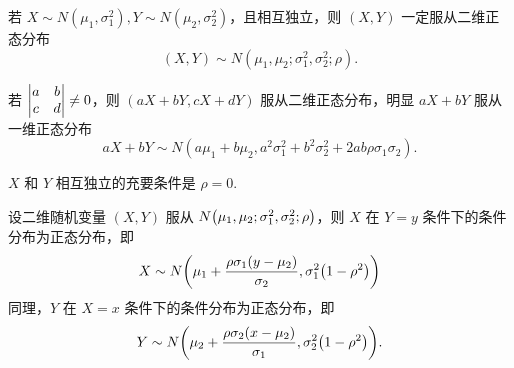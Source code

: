 \begin{theorem}[独立一维正态分布推出二维正态分布]
    若 $ X \sim N\left(\mu_{1}, \sigma_{1}^{2}\right), Y \sim N\left(\mu_{2}, \sigma_{2}^{2}\right)$，且相互独立，则 $ (X, Y) $ 一定服从二维正态分布
    $$ (X, Y) \sim N\left(\mu_{1}, \mu_{2}; \sigma_{1}^{2}, \sigma_{2}^{2}; \rho\right) .$$
\end{theorem}

\begin{theorem}
    若 $\mqty|a&b\\c&d|\neq0$，则 $ (a X+b Y, c X+d Y) $ 服从二维正态分布，明显 $ a X+b Y $ 服从一维正态分布
    $$a X+b Y \sim N\left(a \mu_{1}+b \mu_{2}, a^{2} \sigma_{1}^{2}+b^{2} \sigma_{2}^{2}+2 a b \rho \sigma_{1} \sigma_{2}\right) .$$
\end{theorem}

\begin{theorem}
    $X $ 和 $ Y $ 相互独立的充要条件是 $ \rho=0 .$
\end{theorem}

\begin{theorem}[二维正态分布的条件分布]
    设二维随机变量 $(X,Y)$ 服从 $N\qty(\mu_1,\mu_2;\sigma^2_1,\sigma^2_2;\rho)$，则 $X$ 在 $Y=y$ 条件下的条件分布为正态分布，即
    $$X\sim N\qty(\mu_1+\dfrac{\rho\sigma_1(y-\mu_2)}{\sigma_2},\sigma_1^2\qty(1-\rho^2))$$
    同理，$Y$ 在 $X=x$ 条件下的条件分布为正态分布，即
    $$Y\sim N\qty(\mu_2+\dfrac{\rho\sigma_2(x-\mu_2)}{\sigma_1},\sigma_2^2\qty(1-\rho^2)).$$
\end{theorem}

